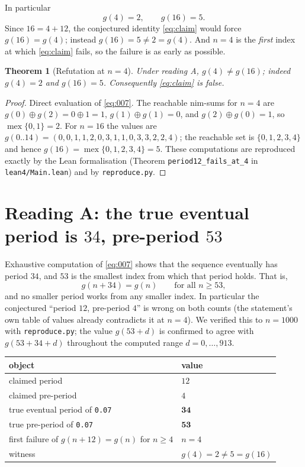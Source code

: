 \documentclass[11pt]{article}
\newtheorem{theorem}{Theorem}
\newcommand{\mex}{\operatorname{mex}}
\newcommand{\Sg}{g}
\begin{document}
In particular
\[
  \Sg(4)=2,\qquad \Sg(16)=5 .
\]
Since $16=4+12$, the conjectured identity \eqref{eq:claim} would force
$\Sg(16)=\Sg(4)$; instead $\Sg(16)=5\ne 2=\Sg(4)$. And $n=4$ is the
\emph{first} index at which \eqref{eq:claim} fails, so the failure is as
early as possible.

\begin{theorem}[Refutation at $n=4$]\label{thm:main}
Under reading A, $\Sg(4)\ne\Sg(16)$; indeed $\Sg(4)=2$ and
$\Sg(16)=5$. Consequently \eqref{eq:claim} is false.
\end{theorem}
\begin{proof}
Direct evaluation of \eqref{eq:007}. The reachable nim-sums for $n=4$
are $\Sg(0)\oplus\Sg(2)=0\oplus1=1$, $\Sg(1)\oplus\Sg(1)=0$, and
$\Sg(2)\oplus\Sg(0)=1$, so $\mex\{0,1\}=2$. For $n=16$ the values are
$\Sg(0..14)=(0,0,1,1,2,0,3,1,1,0,3,3,2,2,4)$; the reachable set is
$\{0,1,2,3,4\}$ and hence $\Sg(16)=\mex\{0,1,2,3,4\}=5$. These
computations are reproduced exactly by the Lean formalisation
(Theorem \texttt{period12\_fails\_at\_4} in \texttt{lean4/Main.lean})
and by \texttt{reproduce.py}.
\end{proof}

\section{Reading A: the true eventual period is $34$, pre-period $53$}

Exhaustive computation of \eqref{eq:007} shows that the sequence
eventually has period $34$, and $53$ is the smallest index from which
that period holds. That is,
\[
  \Sg(n+34)=\Sg(n)\qquad\text{for all }n\ge 53,
\]
and no smaller period works from any smaller index. In particular the
conjectured ``period $12$, pre-period $4$'' is wrong on both counts
(the statement's own table of values already contradicts it at $n=4$).
We verified this to $n=1000$ with \texttt{reproduce.py}; the value
$\Sg(53+d)$ is confirmed to agree with $\Sg(53+34+d)$ throughout the
computed range $d=0,\dots,913$.

\begin{center}
\begin{tabular}{ll}
\hline
object & value \\
\hline
claimed period & $12$ \\
claimed pre-period & $4$ \\
true eventual period of \texttt{0.07} & $\mathbf{34}$ \\
true pre-period of \texttt{0.07} & $\mathbf{53}$ \\
first failure of $\Sg(n+12)=\Sg(n)$ for $n\ge4$ & $n=4$ \\
witness & $\Sg(4)=2\ne5=\Sg(16)$ \\
\hline
\end{tabular}
\end{center}
\end{document}
